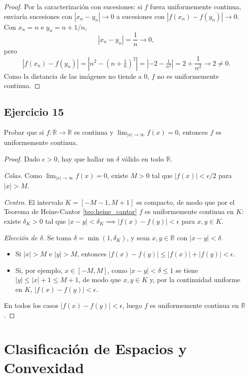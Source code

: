 \documentclass[11pt, a4paper]{article}
\begin{document}
\begin{proof}
Por la caracterización con sucesiones: si $f$ fuera uniformemente continua, enviaría sucesiones con
$|x_n - y_n| \to 0$ a sucesiones con $|f(x_n) - f(y_n)| \to 0$. Con $x_n = n$ e $y_n = n + 1/n$,
$$ |x_n - y_n| = \frac{1}{n} \to 0, $$
pero
$$ |f(x_n) - f(y_n)| = \left| n^2 - \left(n + \tfrac{1}{n}\right)^2 \right|
= \left| -2 - \tfrac{1}{n^2} \right| = 2 + \frac{1}{n^2} \to 2 \neq 0. $$
Como la distancia de las imágenes no tiende a $0$, $f$ no es uniformemente continua.
\end{proof}

\subsection*{Ejercicio 15}

Probar que si $f: \mathbb{R} \to \mathbb{R}$ es continua y $\lim_{|x| \to \infty} f(x) = 0$,
entonces $f$ es uniformemente continua.

\begin{proof}
Dado $\epsilon > 0$, hay que hallar un $\delta$ válido en todo $\mathbb{R}$.

\textit{Colas.} Como $\lim_{|x| \to \infty} f(x) = 0$, existe $M > 0$ tal que $|f(x)| < \epsilon/2$
para $|x| > M$.

\textit{Centro.} El intervalo $K = [-M-1, M+1]$ es compacto, de modo que por el Teorema de Heine-Cantor
\ref{teo:heine_cantor} $f$ es uniformemente continua en $K$: existe $\delta_K > 0$ tal que
$|x - y| < \delta_K \implies |f(x) - f(y)| < \epsilon$ para $x, y \in K$.

\textit{Elección de $\delta$.} Se toma $\delta = \min(1, \delta_K)$, y sean $x, y \in \mathbb{R}$ con
$|x - y| < \delta$.
\begin{itemize}
    \item Si $|x| > M$ e $|y| > M$, entonces $|f(x) - f(y)| \le |f(x)| + |f(y)| < \epsilon$.
    \item Si, por ejemplo, $x \in [-M, M]$, como $|x - y| < \delta \le 1$ se tiene
    $|y| \le |x| + 1 \le M + 1$, de modo que $x, y \in K$ y, por la continuidad uniforme en $K$,
    $|f(x) - f(y)| < \epsilon$.
\end{itemize}
En todos los casos $|f(x) - f(y)| < \epsilon$, luego $f$ es uniformemente continua en $\mathbb{R}$.
\end{proof}

\newpage

\section{Clasificación de Espacios y Convexidad}
\end{document}
